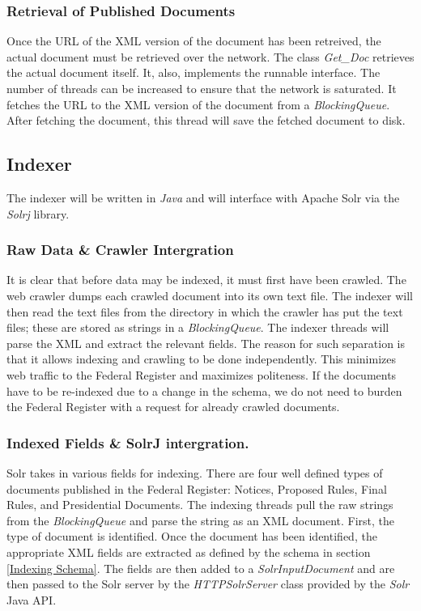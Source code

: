\documentclass{sig-alternate-05-2015}
\begin{document}
\subsubsection{Retrieval of Published Documents}
Once the URL of the XML version of the document has been retreived, the actual document must be retrieved over the network. The class \emph{Get\_Doc} retrieves the actual document itself. It, also, implements the runnable interface. The number of threads can be increased to ensure that the network is saturated. It fetches the URL to the XML version of the document from a \emph{BlockingQueue}. After fetching the document, this thread will save the fetched document to disk.

\subsection{Indexer}
The indexer will be written in \emph{Java} and will interface with Apache Solr via the \emph{Solrj} library.
\subsubsection{Raw Data \& Crawler Intergration}
It is clear that before data may be indexed, it must first have been crawled. The web crawler dumps each crawled document into its own text file. The indexer will then read the text files from the directory in which the crawler has put the text files; these are stored as strings in a \emph{BlockingQueue}. The indexer threads will parse the XML and extract the relevant fields. The reason for such separation is that it allows indexing and crawling to be done independently. This  minimizes web traffic to the Federal Register and maximizes politeness. If the documents have to be re-indexed due to a change in the schema, we do not need to burden the Federal Register with a request for already crawled documents.

\subsubsection{Indexed Fields \& SolrJ intergration.}
Solr takes in various fields for indexing. There are four well defined types of documents published in the Federal Register: Notices, Proposed Rules, Final Rules, and Presidential Documents. The indexing threads pull the raw strings from the \emph{BlockingQueue} and parse the string as an XML document. First, the type of document is identified. Once the document has been identified, the appropriate XML fields are extracted as defined by the schema in section \ref{Indexing Schema}. The fields are then added to a \emph{SolrInputDocument} and are then passed to the Solr server by the \emph{HTTPSolrServer} class provided by the \emph{Solr} Java API.
\end{document}
